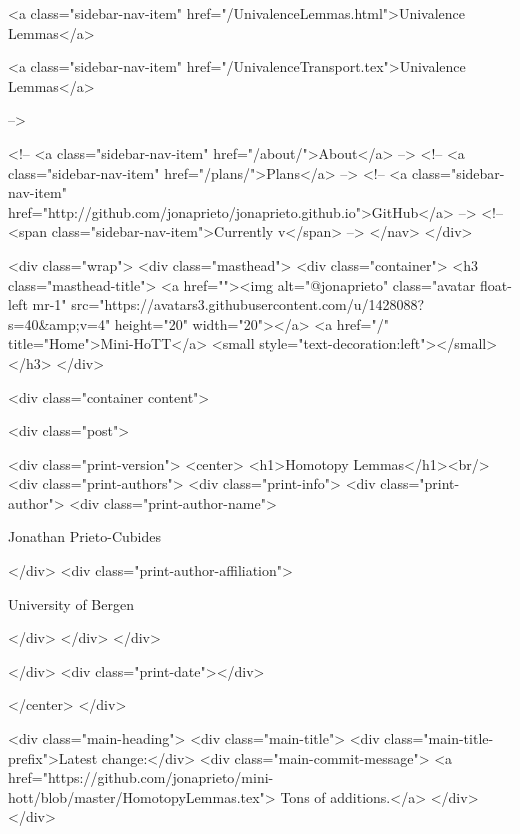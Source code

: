       
    
      
        
          <a class="sidebar-nav-item" href="/UnivalenceLemmas.html">Univalence Lemmas</a>
        
      
    
      
        
          <a class="sidebar-nav-item" href="/UnivalenceTransport.tex">Univalence Lemmas</a>
        
      
     -->

    <!-- <a class="sidebar-nav-item" href="/about/">About</a> -->
    <!-- <a class="sidebar-nav-item" href="/plans/">Plans</a> -->
    <!-- <a class="sidebar-nav-item" href="http://github.com/jonaprieto/jonaprieto.github.io">GitHub</a> -->
    <!-- <span class="sidebar-nav-item">Currently v</span> -->
  </nav>
</div>

    <div class="wrap">
      <div class="masthead">
        <div class="container">
          <h3 class="masthead-title">
            <a href=""><img alt="@jonaprieto" class="avatar float-left mr-1" src="https://avatars3.githubusercontent.com/u/1428088?s=40&amp;v=4" height="20" width="20"></a>
            <a href="/" title="Home">Mini-HoTT</a>
            <small style="text-decoration:left"></small>
          </h3>
        </div>
      
      <div class="container content">
        







<div class="post">

  <div class="print-version">
    <center>
      <h1>Homotopy Lemmas</h1><br/>
        <div class="print-authors">
          <div class="print-info">
            <div class="print-author">
              <div class="print-author-name">
                
                  Jonathan Prieto-Cubides
                
              </div>
              <div class="print-author-affiliation">
                
                  University of Bergen
                
                </div>
            </div>
          </div>
          
          
        </div>
        <div class="print-date"></div>
        
        
    </center>
  </div>

  
  <div class="main-heading">
    <div class="main-title">
      <div class="main-title-prefix">Latest change:</div>
      <div class="main-commit-message">
            <a href="https://github.com/jonaprieto/mini-hott/blob/master/HomotopyLemmas.tex">
              Tons of additions.</a>
      </div>
    </div>

